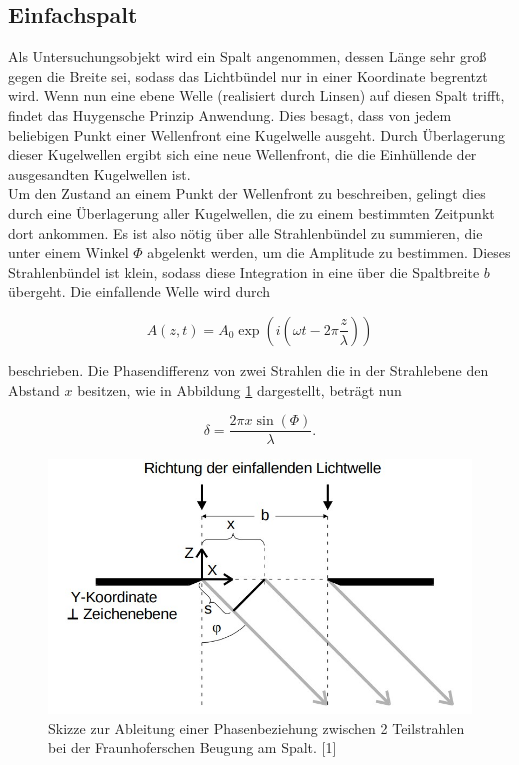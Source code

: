 \subsection{Einfachspalt}

Als Untersuchungsobjekt wird ein Spalt angenommen, dessen Länge sehr groß gegen die Breite sei, sodass 
das Lichtbündel nur in einer Koordinate begrentzt wird. Wenn nun eine ebene Welle (realisiert durch Linsen)
auf diesen Spalt trifft, findet das Huygensche Prinzip Anwendung. Dies besagt, dass 
von jedem beliebigen Punkt einer Wellenfront eine Kugelwelle ausgeht. Durch Überlagerung dieser Kugelwellen
ergibt sich eine neue Wellenfront, die die Einhüllende der ausgesandten Kugelwellen ist. \\
Um den Zustand 
an einem Punkt der Wellenfront zu beschreiben, gelingt dies durch eine Überlagerung aller Kugelwellen, die
zu einem bestimmten Zeitpunkt dort ankommen. Es ist also nötig über alle Strahlenbündel zu summieren, die 
unter einem Winkel $\Phi$ abgelenkt werden, um die Amplitude zu bestimmen. Dieses Strahlenbündel ist klein, 
sodass diese Integration in eine über die Spaltbreite $b$ übergeht. 
Die einfallende Welle wird durch 

\begin{equation*}
A(z,t) = A_0\exp{\left(i(\omega t - 2\pi\frac{z}{\lambda})\right)}
\end{equation*}

beschrieben. Die Phasendifferenz von zwei Strahlen die in der Strahlebene den Abstand $x$ besitzen, wie 
in Abbildung \ref{fig:Phase} dargestellt, beträgt nun 

\begin{equation*}
\delta = \frac{2\pi x\sin{(\Phi)}}{\lambda}. 
\end{equation*}

\begin{figure}
  \centering
  \includegraphics[scale=0.3]{content/Phase.jpg}
  \caption{Skizze zur Ableitung einer Phasenbeziehung zwischen 2 Teilstrahlen bei der Fraunhoferschen
Beugung am Spalt. [1]}
  \label{fig:Phase}
\end{figure}

